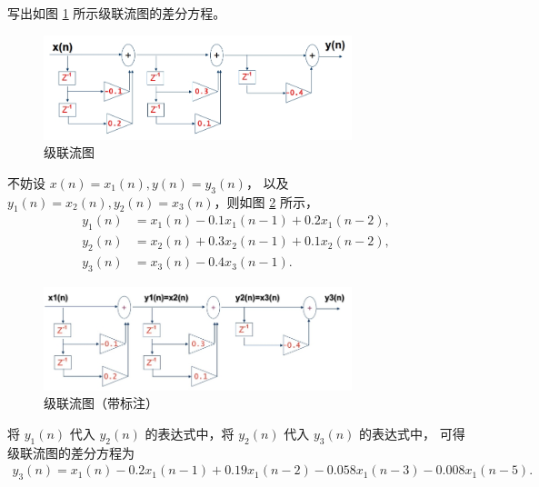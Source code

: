 \begin{example}
    \label{exercise:serial-flow-graph}
    写出如图 \ref{fig:serial-flow-graph} 所示级联流图的差分方程。
    \begin{figure}[H]
        \centering
        \includegraphics[width=0.8\textwidth]{chap4/img/serial_flow_graph.png}
        \caption{级联流图}
        \label{fig:serial-flow-graph}
    \end{figure}
\end{example}

\begin{solution}
    不妨设 $x(n) = x_1(n), y(n) = y_3(n)$，
    以及 $y_1(n) = x_2(n), y_2(n) = x_3(n)$，则如图 \ref{fig:serial-flow-graph-annotated} 所示，
    \begin{align*}
        y_1(n) & = x_1(n) - 0.1x_1(n - 1) + 0.2x_1(n - 2), \\
        y_2(n) & = x_2(n) + 0.3x_2(n - 1) + 0.1x_2(n - 2), \\
        y_3(n) & = x_3(n) - 0.4x_3(n - 1).
    \end{align*}
    \begin{figure}[H]
        \centering
        \includegraphics[width=0.8\textwidth]{chap4/img/serial_flow_graph_annotated.png}
        \caption{级联流图（带标注）}
        \label{fig:serial-flow-graph-annotated}
    \end{figure}
    将 $y_1(n)$ 代入 $y_2(n)$ 的表达式中，将 $y_2(n)$ 代入 $y_3(n)$ 的表达式中，
    可得级联流图的差分方程为
    \begin{align*}
        y_3(n) = x_1(n) - 0.2x_1(n - 1) + 0.19x_1(n - 2) - 0.058x_1(n - 3) - 0.008x_1(n - 5).
    \end{align*}
\end{solution}

